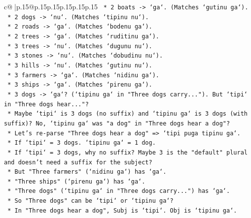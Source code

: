 \documentclass{article}
\begin{document}
{\begin{supertabular}{c@{$\;$}|p{.15\linewidth}@{}p{.15\linewidth}p{.15\linewidth}p{.15\linewidth}p{.15\linewidth}p{.15\linewidth}}
{{{\texttt{                            *   2 boats {-}> `ga`. (Matches `gutinu ga`).} \\
\texttt{                            *   2 dogs {-}> `nu`. (Matches `tipinu nu`).} \\
\texttt{                            *   2 roads {-}> `ga`. (Matches `bodenu ga`).} \\
\texttt{                            *   2 trees {-}> `ga`. (Matches `ruditinu ga`).} \\
\texttt{                            *   3 trees {-}> `nu`. (Matches `dugunu nu`).} \\
\texttt{                            *   3 stones {-}> `nu`. (Matches `dobudinu nu`).} \\
\texttt{                            *   3 hills {-}> `nu`. (Matches `gutinu nu`).} \\
\texttt{                            *   3 farmers {-}> `ga`. (Matches `nidinu ga`).} \\
\texttt{                            *   3 ships {-}> `ga`. (Matches `pirenu ga`).} \\
\texttt{                            *   3 dogs {-}> `ga`? (`tipinu ga` in "Three dogs carry..."). But `tipi` in "Three dogs hear..."?} \\
\texttt{                            *   Maybe `tipi` is 3 dogs (no suffix) and `tipinu ga` is 3 dogs (with suffix)? No, `tipinu ga` was "a dog" in "Three dogs hear a dog"?} \\
\texttt{                            *   Let's re{-}parse "Three dogs hear a dog" => `tipi puga tipinu ga`.} \\
\texttt{                                *   If `tipi` = 3 dogs. `tipinu ga` = 1 dog.} \\
\texttt{                                *   If `tipi` = 3 dogs, why no suffix? Maybe 3 is the "default" plural and doesn't need a suffix for the subject?} \\
\texttt{                                *   But "Three farmers" (`nidinu ga`) has `ga`.} \\
\texttt{                                *   "Three ships" (`pirenu ga`) has `ga`.} \\
\texttt{                                *   "Three dogs" (`tipinu ga` in "Three dogs carry...") has `ga`.} \\
\texttt{                                *   So "Three dogs" can be `tipi` or `tipinu ga`?} \\
\texttt{                                *   In "Three dogs hear a dog", Subj is `tipi`. Obj is `tipinu ga`.} \\
}}}
\end{supertabular}}
\end{document}
